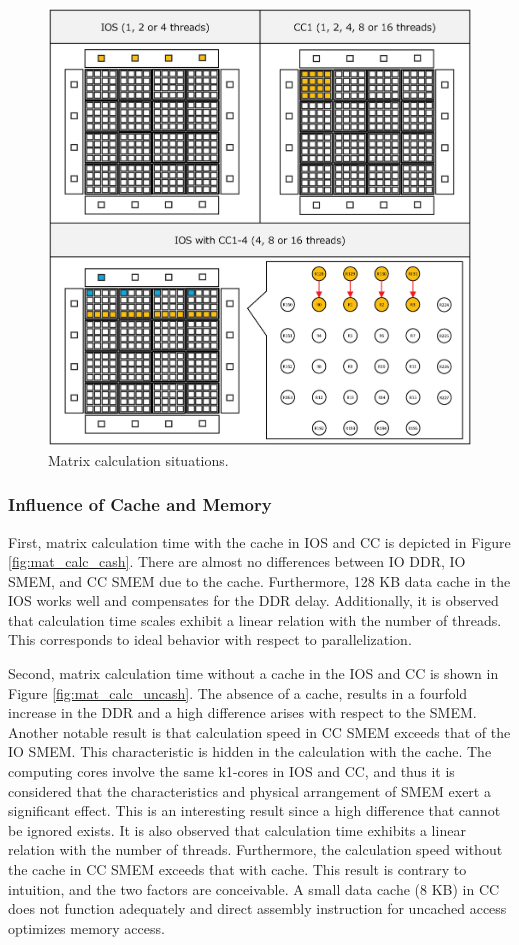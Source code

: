 \documentclass[conference,compsoc]{IEEEtran}
\begin{document}
\begin{figure}[t]
  \centering
  \includegraphics[width=0.8\linewidth]{../figure/matrix_calculation.eps}
  \caption{\label{fig:mat_calc}
    Matrix calculation situations.}
\end{figure}

\subsubsection{Influence of Cache and Memory}
\label{sec:cache_and_memory}
First, matrix calculation time with the cache in IOS and CC is depicted in Figure \ref{fig:mat_calc_cash}.
There are almost no differences between IO DDR, IO SMEM, and CC SMEM due to the cache.
Furthermore, 128 KB data cache in the IOS works well and compensates for the DDR delay.
Additionally, it is observed that calculation time scales exhibit a linear relation with the number of threads.
This corresponds to ideal behavior with respect to parallelization.

Second, matrix calculation time without a cache in the IOS and CC is shown in Figure \ref{fig:mat_calc_uncash}.
The absence of a cache, results in a fourfold increase in the DDR and a high difference arises with respect to the SMEM.
Another notable result is that calculation speed in CC SMEM exceeds that of the IO SMEM.
This characteristic is hidden in the calculation with the cache.
The computing cores involve the same k1-cores in IOS and CC, and thus it is considered that the characteristics and physical arrangement of SMEM exert a significant effect.
This is an interesting result since a high difference that cannot be ignored exists.
It is also observed that calculation time exhibits a linear relation with the number of threads.
Furthermore, the calculation speed without the cache in CC SMEM exceeds that with cache.
This result is contrary to intuition, and the two factors are conceivable.
A small data cache (8 KB) in CC does not function adequately and direct assembly instruction for uncached access optimizes memory access.
\end{document}
